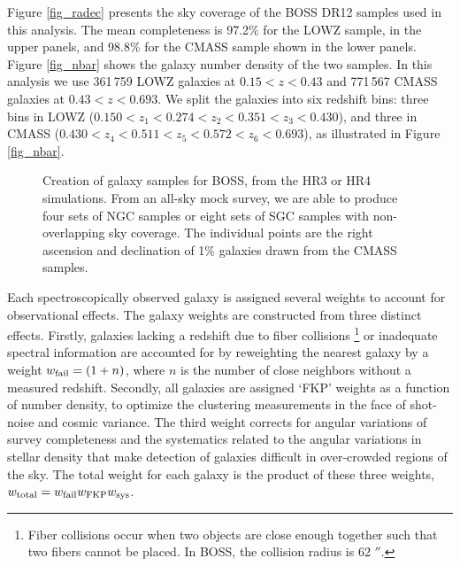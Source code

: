 \documentclass[iop]{emulateapj}
\begin{document}
Figure \ref{fig_radec} presents the sky coverage of the BOSS DR12 samples used in this analysis. 
The mean completeness is 97.2\% for the LOWZ sample, in the upper panels, and 98.8\% for the CMASS sample shown in the lower panels.
Figure \ref{fig_nbar} shows the galaxy number density of the two samples.
In this analysis we use 361\,759 LOWZ galaxies at $0.15<z <0.43$ and 
771\,567 CMASS galaxies at $0.43< z < 0.693$.
We split the galaxies into six redshift bins: 
three bins in LOWZ ($0.150<z_1<0.274<z_2<0.351<z_3<0.430$), 
and three in CMASS ($0.430<z_4<0.511<z_5<0.572<z_6<0.693$), 
as illustrated in Figure \ref{fig_nbar}.

\begin{figure*}
   \caption{\label{fig_mock}
      Creation of galaxy samples for BOSS, from the HR3 or HR4 simulations.
      From an all-sky mock survey,
       we are able to produce four sets of NGC samples or eight sets of SGC samples with non-overlapping sky coverage.
      The individual points are the right ascension and declination of 1\% galaxies drawn from the CMASS samples.
      }
\end{figure*}

Each spectroscopically observed galaxy is assigned several weights to account for observational effects. 
The galaxy weights are constructed from three distinct effects.
Firstly, galaxies lacking a redshift due to fiber collisions 
\footnote{Fiber collisions occur when two objects are close enough together such that two fibers cannot be placed.
In BOSS, the collision radius is 62 $''$.}
or inadequate spectral information are accounted for by reweighting
the nearest galaxy by a weight $w_{\rm fail}=(1+n)$, 
where $n$ is the number of close neighbors without a measured redshift. 
Secondly, all galaxies are assigned `FKP' weights \citep{1994ApJ...426...23F}
as a function of number density,
to optimize the clustering measurements in the face of shot-noise and cosmic variance.
The third weight corrects for angular variations of survey completeness and the systematics 
related to the angular variations in stellar density that make detection of
galaxies difficult in over-crowded regions of the sky. %
The total weight for each galaxy is the product of these three weights, $w_{\rm total}=w_{\rm fail}w_{\rm FKP}w_{\rm sys}$. 
\end{document}
